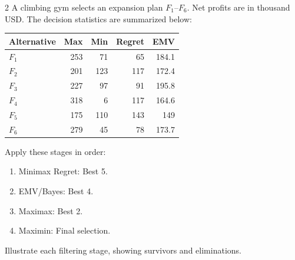 \begin{multicols}{2}
\raggedcolumns
{}
A climbing gym selects an expansion plan $F_1$--$F_6$. Net profits are in thousand USD. The decision statistics are summarized below:
\vspace{-3mm}
\begin{center}\small\setlength{\tabcolsep}{4pt}
	\begin{tabular}{lrrrr}\toprule
		Alternative & Max & Min & Regret & EMV\\ \midrule
		$F_1$ & 253 & 71 & 65 & 184.1\\
		$F_2$ & 201 & 123 & 117 & 172.4\\
		$F_3$ & 227 & 97 & 91 & 195.8\\
		$F_4$ & 318 & 6 & 117 & 164.6\\
		$F_5$ & 175 & 110 & 143 & 149\\
		$F_6$ & 279 & 45 & 78 & 173.7\\
		\bottomrule
	\end{tabular}
\end{center}
\vspace{-3mm}
Apply these stages in order:
\begin{enumerate}[leftmargin=*]
	\item Minimax Regret: Best 5.
	\item EMV/Bayes: Best 4.
	\item Maximax: Best 2.
	\item Maximin: Final selection.
\end{enumerate}
Illustrate each filtering stage, showing survivors and eliminations.



\end{multicols}
